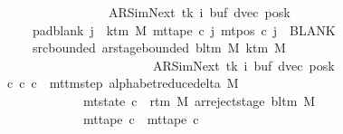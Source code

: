 \begin{isabellebody}
\ \ \ \ \ \ \ \ \ \ \ \ \ \ \ \ \ \ \ {\isacharparenleft}{\kern0pt}AR{\isacharunderscore}{\kern0pt}SimNext{\isacharcomma}{\kern0pt}\ tk{\isacharcomma}{\kern0pt}\ i{\isacharcomma}{\kern0pt}\ buf{\isacharcomma}{\kern0pt}\ dvec{\isacharcomma}{\kern0pt}\ posk{\isacharparenright}{\kern0pt}{\isachardoublequoteclose}\isanewline
\ \ \ \ \ \ \ pad{\isacharunderscore}{\kern0pt}blank{\isacharcolon}{\kern0pt}\ {\isachardoublequoteopen}{\isasymforall}j\ {\isasymge}\ k{\isacharunderscore}{\kern0pt}tm\ M{\isachardot}{\kern0pt}\ mt{\isacharunderscore}{\kern0pt}tape\ c{\isacharprime}{\kern0pt}\ j\ {\isacharparenleft}{\kern0pt}mt{\isacharunderscore}{\kern0pt}pos\ c{\isacharprime}{\kern0pt}\ j{\isacharparenright}{\kern0pt}\ {\isacharequal}{\kern0pt}\ BLANK{}{\isachardoublequoteclose}\isanewline
\ \ \ \ \ \ \ src{\isacharunderscore}{\kern0pt}bounded{\isacharcolon}{\kern0pt}\ {\isachardoublequoteopen}ar{\isacharunderscore}{\kern0pt}stage{\isacharunderscore}{\kern0pt}bounded\ {\isacharparenleft}{\kern0pt}bl{\isacharunderscore}{\kern0pt}tm\ M{\isacharparenright}{\kern0pt}\ {\isacharparenleft}{\kern0pt}k{\isacharunderscore}{\kern0pt}tm\ M{\isacharparenright}{\kern0pt}\isanewline
\ \ \ \ \ \ \ \ \ \ \ \ \ \ \ \ \ \ \ \ \ \ \ \ \ \ {\isacharparenleft}{\kern0pt}AR{\isacharunderscore}{\kern0pt}SimNext{\isacharcomma}{\kern0pt}\ tk{\isacharcomma}{\kern0pt}\ i{\isacharcomma}{\kern0pt}\ buf{\isacharcomma}{\kern0pt}\ dvec{\isacharcomma}{\kern0pt}\ posk{\isacharparenright}{\kern0pt}{\isachardoublequoteclose}\isanewline
\ \ \ {\isachardoublequoteopen}{\isasymexists}c{\isacharprime}{\kern0pt}{\isacharprime}{\kern0pt}{\isachardot}{\kern0pt}\ {\isacharparenleft}{\kern0pt}c{\isacharprime}{\kern0pt}{\isacharcomma}{\kern0pt}\ c{\isacharprime}{\kern0pt}{\isacharprime}{\kern0pt}{\isacharparenright}{\kern0pt}\ {\isasymin}\ mttm{\isacharunderscore}{\kern0pt}step\ {\isacharparenleft}{\kern0pt}alphabet{\isacharunderscore}{\kern0pt}reduce{\isacharunderscore}{\kern0pt}delta\ M{\isacharparenright}{\kern0pt}\isanewline
\ \ \ \ \ \ \ \ \ \ \ \ \ \ {\isasymand}\ mt{\isacharunderscore}{\kern0pt}state\ c{\isacharprime}{\kern0pt}{\isacharprime}{\kern0pt}\ {\isacharequal}{\kern0pt}\ {\isacharparenleft}{\kern0pt}r{\isacharunderscore}{\kern0pt}tm\ M{\isacharcomma}{\kern0pt}\ ar{\isacharunderscore}{\kern0pt}reject{\isacharunderscore}{\kern0pt}stage\ {\isacharparenleft}{\kern0pt}bl{\isacharunderscore}{\kern0pt}tm\ M{\isacharparenright}{\kern0pt}{\isacharparenright}{\kern0pt}\isanewline
\ \ \ \ \ \ \ \ \ \ \ \ \ \ {\isasymand}\ mt{\isacharunderscore}{\kern0pt}tape\ c{\isacharprime}{\kern0pt}{\isacharprime}{\kern0pt}\ {\isacharequal}{\kern0pt}\ mt{\isacharunderscore}{\kern0pt}tape\ c{\isacharprime}{\kern0pt}\isanewline

\end{isabellebody}
